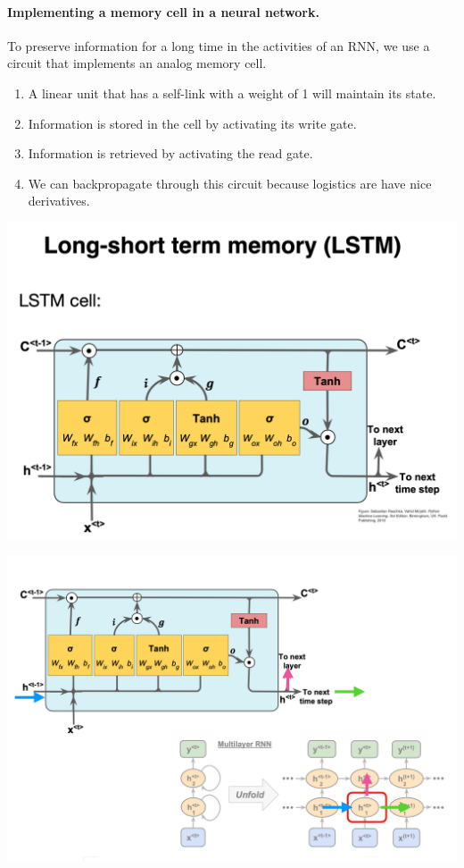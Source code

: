 \documentclass[%
oneside,                 %
final,                   %
10pt]{article}
\begin{document}
\noindent
\paragraph{Implementing a memory cell in a neural network.}
To preserve information for a long time in
the activities of an RNN, we use a circuit
that implements an analog memory cell.

\begin{enumerate}
\item A linear unit that has a self-link with a weight of 1 will maintain its state.

\item Information is stored in the cell by activating its write gate.

\item Information is retrieved by activating the read gate.

\item We can backpropagate through this circuit because logistics are have nice derivatives. 
\end{enumerate}

\noindent
\vspace{6mm}

\centerline{\includegraphics[width=0.9\linewidth]{figslides/RNN13.png}}

\vspace{6mm}

\vspace{6mm}

\centerline{\includegraphics[width=0.9\linewidth]{figslides/RNN14.png}}
\end{document}
